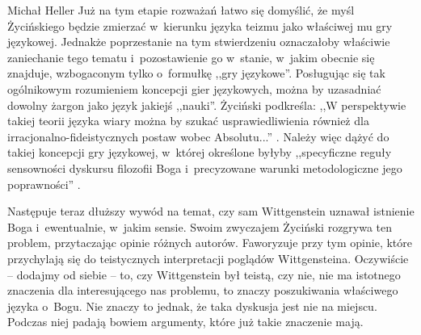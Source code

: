 \begin{artplenv}{Michał Heller}
Już na tym etapie rozważań łatwo się domyślić, że myśl Życińskiego będzie zmierzać w~kierunku języka teizmu jako właściwej mu gry językowej. Jednakże poprzestanie na tym stwierdzeniu oznaczałoby właściwie zaniechanie tego tematu i~pozostawienie go w~stanie, w~jakim obecnie się znajduje, wzbogaconym tylko o~formułkę ,,gry językowe''. Posługując się tak ogólnikowym rozumieniem koncepcji gier językowych, można by uzasadniać dowolny żargon jako język jakiejś ,,nauki''. Życiński podkreśla: ,,W perspektywie takiej teorii języka wiary można by szukać usprawiedliwienia również dla irracjonalno-fideistycznych postaw wobec Absolutu...''
\parencite[][s.~17]{zycinski_teizm_1985}. %
 Należy więc dążyć do takiej koncepcji gry językowej, w~której określone byłyby ,,specyficzne reguły sensowności dyskursu filozofii Boga i~precyzowane warunki metodologiczne jego poprawności'' 
\parencite[][s.~14]{zycinski_teizm_1985}.%


Następuje teraz dłuższy wywód na temat, czy sam Wittgenstein uznawał istnienie Boga i~ewentualnie, w~jakim sensie. Swoim zwyczajem Życiński rozgrywa ten problem, przytaczając opinie różnych autorów. Faworyzuje przy tym opinie, które przychylają się do teistycznych interpretacji poglądów Wittgensteina. Oczywiście -- dodajmy od siebie -- to, czy Wittgenstein był teistą, czy nie, nie ma istotnego znaczenia dla interesującego nas problemu, to znaczy poszukiwania właściwego języka o~Bogu. Nie znaczy to jednak, że taka dyskusja jest nie na miejscu. Podczas niej padają bowiem argumenty, które już takie znaczenie mają.


\end{artplenv}
